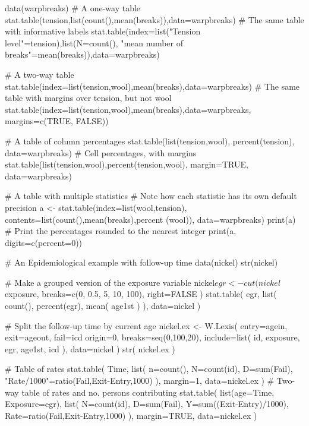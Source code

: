 \begin{Examples}
\begin{ExampleCode}
data(warpbreaks)
# A one-way table
stat.table(tension,list(count(),mean(breaks)),data=warpbreaks)
# The same table with informative labels
stat.table(index=list("Tension level"=tension),list(N=count(),
           "mean number of breaks"=mean(breaks)),data=warpbreaks)

# A two-way table
stat.table(index=list(tension,wool),mean(breaks),data=warpbreaks)  
# The same table with margins over tension, but not wool
stat.table(index=list(tension,wool),mean(breaks),data=warpbreaks,
           margins=c(TRUE, FALSE))

# A table of column percentages
stat.table(list(tension,wool), percent(tension), data=warpbreaks)
# Cell percentages, with margins
stat.table(list(tension,wool),percent(tension,wool), margin=TRUE,
           data=warpbreaks)

# A table with multiple statistics
# Note how each statistic has its own default precision
a <- stat.table(index=list(wool,tension),
                contents=list(count(),mean(breaks),percent (wool)),
                data=warpbreaks)
print(a)
# Print the percentages rounded to the nearest integer
print(a, digits=c(percent=0))

# An Epidemiological example with follow-up time
data(nickel)
str(nickel)

# Make a grouped version of the exposure variable
nickel$egr <- cut( nickel$exposure, breaks=c(0, 0.5, 5, 10, 100), right=FALSE )
stat.table( egr, list( count(), percent(egr), mean( age1st ) ), data=nickel )

# Split the follow-up time by current age
nickel.ex <-
W.Lexis( entry=agein, exit=ageout, fail=icd %
         origin=0, breaks=seq(0,100,20),
         include=list( id, exposure, egr, age1st, icd ), data=nickel )
str( nickel.ex )

# Table of rates
stat.table( Time, list( n=count(), N=count(id), D=sum(Fail),
                        "Rate/1000"=ratio(Fail,Exit-Entry,1000) ),
            margin=1, data=nickel.ex )
# Two-way table of rates and no. persons contributing
stat.table( list(age=Time, Exposure=egr),
            list( N=count(id), D=sum(Fail), Y=sum((Exit-Entry)/1000),
                  Rate=ratio(Fail,Exit-Entry,1000) ),
            margin=TRUE, data=nickel.ex )
\end{ExampleCode}
\end{Examples}

